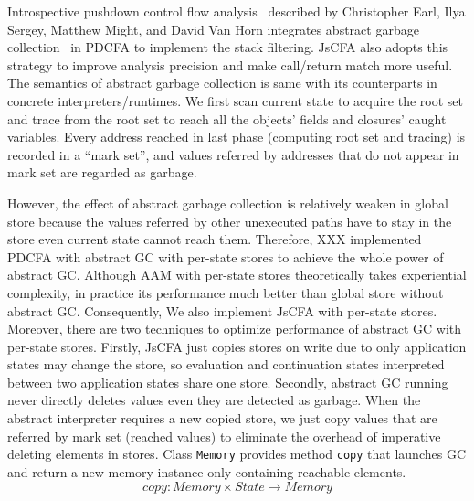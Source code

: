 \documentclass{article}
\begin{document}
Introspective pushdown control flow analysis~\cite{earl2012introspective} described by Christopher Earl, Ilya Sergey, Matthew Might, and David Van Horn integrates abstract garbage collection~\cite{might2006improving} in PDCFA to implement the stack filtering. JsCFA also adopts this strategy to improve analysis precision and make call/return match more useful. The semantics of abstract garbage collection is same with its counterparts in concrete interpreters/runtimes.
We first scan current state to acquire the root set and trace from the root set to reach all the objects' fields and closures' caught variables. Every address reached in last phase (computing root set and tracing) is recorded in a ``mark set'', and values referred by addresses that do not appear in mark set are regarded as garbage.

However, the effect of abstract garbage collection is relatively weaken in global store because the values referred by other unexecuted paths have to stay in the store even current state cannot reach them. Therefore, XXX implemented PDCFA with abstract GC with per-state stores to achieve the whole power of abstract GC\@. Although AAM with per-state stores theoretically takes experiential complexity, in practice its performance much better than global store without abstract GC\@.
Consequently, We also implement JsCFA with per-state stores. Moreover, there are two techniques to optimize performance of abstract GC with per-state stores. Firstly, JsCFA just copies stores on write due to only application states may change the store, so evaluation and continuation states interpreted between two application states share one store. Secondly, abstract GC running never directly deletes values even they are detected as garbage. When the abstract interpreter requires a new copied store, we just copy values that are referred by mark set (reached values) to eliminate the overhead of imperative deleting elements in stores.
Class \verb|Memory| provides method \verb|copy| that launches GC and return a new memory instance only containing reachable elements.
\[
copy: Memory \times State \to Memory
\]
\end{document}

